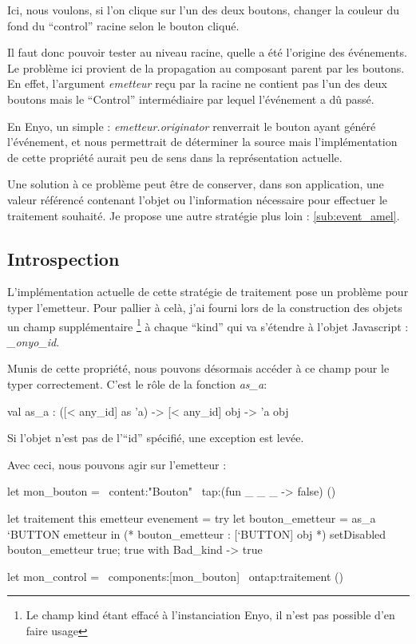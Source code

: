 \documentclass[11pt,a4paper]{report}
\begin{document}
Ici, nous voulons, si l'on clique sur l'un des deux boutons, changer la couleur du fond du
``control'' racine selon le bouton cliqué.

Il faut donc pouvoir tester au niveau racine, quelle a été l'origine des événements.
Le problème ici provient de la propagation au composant parent par les boutons.
En effet, l'argument \emph{emetteur} reçu par la racine ne contient pas l'un des deux boutons
mais le ``Control'' intermédiaire par lequel l'événement a dû passé.

En Enyo, un simple : \emph{emetteur.originator} renverrait le bouton ayant généré l'événement,
et nous permettrait de déterminer la source mais l'implémentation de cette propriété aurait 
peu de sens dans la représentation actuelle.

Une solution à ce problème peut être de conserver, dans son application, une valeur référencé 
contenant l'objet ou l'information nécessaire pour effectuer le traitement souhaité.
Je propose une autre stratégie plus loin : \ref{sub:event_amel}.

\subsection{Introspection}

L'implémentation actuelle de cette stratégie de traitement pose un problème pour typer l'emetteur.
Pour pallier à celà, j'ai fourni lors de la construction des objets un champ supplémentaire
\footnote{Le champ kind étant effacé à l'instanciation Enyo, il n'est pas possible d'en faire usage} à chaque
``kind'' qui va s'étendre à l'objet Javascript : \emph{\_onyo\_id}.

Munis de cette propriété, nous pouvons désormais accéder à ce champ pour le typer correctement.
C'est le rôle de la fonction \emph{as\_a}:

\begin{OCaml}
  val as_a : ([< any_id] as 'a) -> [< any_id] obj -> 'a obj
\end{OCaml}

Si l'objet n'est pas de l'``id'' spécifié, une exception est levée.

Avec ceci, nous pouvons agir sur l'emetteur :
\begin{OCaml}
  let mon_bouton = ~content:"Bouton" ~tap:(fun _ _ _ -> false) ()

  let traitement this emetteur evenement =
     try 
         let bouton_emetteur = as_a `BUTTON emetteur in
         (* bouton_emetteur : [`BUTTON] obj *)
         setDisabled bouton_emetteur true;
         true
     with Bad_kind -> true

  let mon_control = ~components:[mon_bouton] ~ontap:traitement ()
\end{OCaml}
\end{document}
